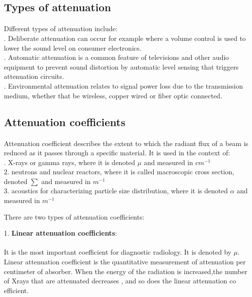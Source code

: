 \documentclass[12pt,a4paper]{article}%
\begin{document}
\begin{flushleft}
		\subsection{Types of attenuation} 
		\paragraph{}
		Different types of attenuation include:\\. Deliberate attenuation can occur for example where a volume control is used to lower the sound level on consumer electronics.\\. Automatic attenuation is a common feature of televisions and other audio equipment to prevent sound distortion by automatic level sensing that triggers attenuation circuits.\\. Environmental attenuation relates to signal power loss due to the transmission medium, whether that be wireless, copper wired or fiber optic connected.
		
		
		
		\subsection{Attenuation coefficients} 
		\paragraph{}
		Attenuation coefficient describes the extent to which the radiant flux of a beam is reduced as it passes through a specific material. It is used in the context of:\\. X-rays or gamma rays, where it is denoted $\mu$ and measured in $cm^{-1}$\\
		2. neutrons and nuclear reactors, where it is called macroscopic cross section, denoted $\sum$ and measured in $m^{−1}$ \\
		3. acoustics for characterizing particle size distribution, where it is denoted $\alpha$ and measured in $m^{-1}$\\\bigskip
		
		There are  two types of attenuation coefficients:\\\bigskip
		
		1. \textbf{Linear attenuation coefficients}:
		\paragraph{}
		It is the most important coefficient for diagnostic radiology. It is denoted by $\mu$. Linear attenuation coefficient is the quantitative measurement of attenuation per
		centimeter of absorber. When the energy of the radiation is increased,the number of Xrays
		that are attenuated decreases , and so does the linear attenuation
		co efficient.\\\bigskip 
		

\end{flushleft}
\end{document}
